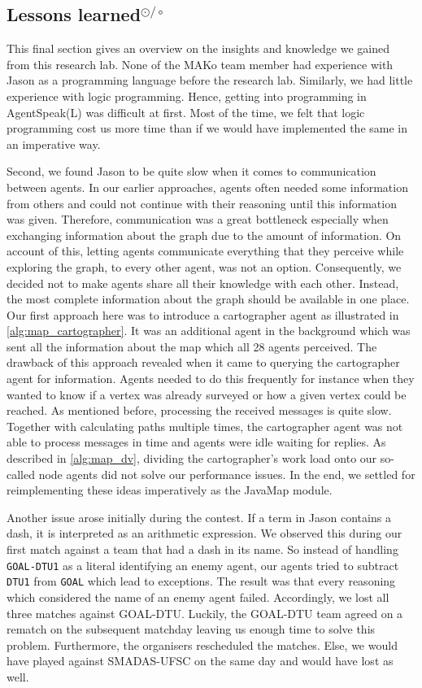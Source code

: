 \subsection{Lessons learned$^{\odot/\circ}$}
This final section gives an overview on the insights and knowledge we gained from this research lab.
None of the MAKo team member had experience with Jason as a programming language before the research lab.
Similarly, we had little experience with logic programming.
Hence, getting into programming in AgentSpeak(L) was difficult at first.
Most of the time, we felt that logic programming cost us more time than if we would have implemented the same in an imperative way.

Second, we found Jason to be quite slow when it comes to communication between agents.
In our earlier approaches, agents often needed some information from others and could not continue with their reasoning until this information was given.
Therefore, communication was a great bottleneck especially when exchanging information about the graph due to the amount of information.
On account of this, letting agents communicate everything that they perceive while exploring the graph, to every other agent, was not an option.
Consequently, we decided not to make agents share all their knowledge with each other.
Instead, the most complete information about the graph should be available in one place.
Our first approach here was to introduce a cartographer agent as illustrated in \autoref{alg:map_cartographer}.
It was an additional agent in the background which was sent all the information about the map which all 28 agents perceived.
The drawback of this approach revealed when it came to querying the cartographer agent for information.
Agents needed to do this frequently for instance when they wanted to know if a vertex was already surveyed or how a given vertex could be reached.
As mentioned before, processing the received messages is quite slow.
Together with calculating paths multiple times, the cartographer agent was not able to process messages in time and agents were idle waiting for replies.
As described in \autoref{alg:map_dv}, dividing the cartographer's work load onto our so-called node agents did not solve our performance issues.
In the end, we settled for reimplementing these ideas imperatively as the JavaMap module.

Another issue arose initially during the contest.
If a term in Jason contains a dash, it is interpreted as an arithmetic expression.
We observed this during our first match against a team that had a dash in its name.
So instead of handling \texttt{GOAL-DTU1} as a literal identifying an enemy agent, our agents tried to subtract \texttt{DTU1} from \texttt{GOAL} which lead to exceptions.
The result was that every reasoning which considered the name of an enemy agent failed.
Accordingly, we lost all three matches against GOAL-DTU.
Luckily, the GOAL-DTU team agreed on a rematch on the subsequent matchday leaving us enough time to solve this problem.
Furthermore, the organisers rescheduled the matches.
Else, we would have played against SMADAS-UFSC on the same day and would have lost as well.

